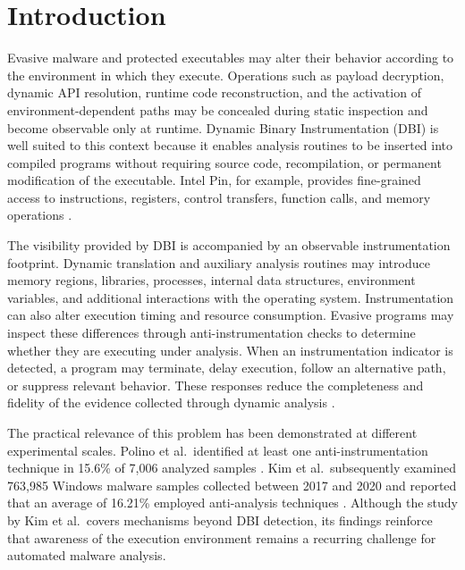 \documentclass[pdflatex,sn-mathphys-num]{sn-jnl}
\theoremstyle{thmstyleone}
\theoremstyle{thmstyletwo}
\theoremstyle{thmstylethree}
\begin{document}

\maketitle

\section{Introduction}
\label{sec:introduction}

Evasive malware and protected executables may alter their behavior according to the environment in which they execute. Operations such as payload decryption, dynamic API resolution, runtime code reconstruction, and the activation of environment-dependent paths may be concealed during static inspection and become observable only at runtime. Dynamic Binary Instrumentation (DBI) is well suited to this context because it enables analysis routines to be inserted into compiled programs without requiring source code, recompilation, or permanent modification of the executable. Intel Pin, for example, provides fine-grained access to instructions, registers, control transfers, function calls, and memory operations \cite{luk2005pin}.

The visibility provided by DBI is accompanied by an observable instrumentation footprint. Dynamic translation and auxiliary analysis routines may introduce memory regions, libraries, processes, internal data structures, environment variables, and additional interactions with the operating system. Instrumentation can also alter execution timing and resource consumption. Evasive programs may inspect these differences through anti-instrumentation checks to determine whether they are executing under analysis. When an instrumentation indicator is detected, a program may terminate, delay execution, follow an alternative path, or suppress relevant behavior. These responses reduce the completeness and fidelity of the evidence collected through dynamic analysis \cite{Rodriguez2016,GiorgioC2022}.

The practical relevance of this problem has been demonstrated at different experimental scales. Polino et al.\ identified at least one anti-instrumentation technique in 15.6\% of 7,006 analyzed samples \cite{polino2017measuring}. Kim et al.\ subsequently examined 763,985 Windows malware samples collected between 2017 and 2020 and reported that an average of 16.21\% employed anti-analysis techniques \cite{kim2022large}. Although the study by Kim et al.\ covers mechanisms beyond DBI detection, its findings reinforce that awareness of the execution environment remains a recurring challenge for automated malware analysis.
\end{document}
